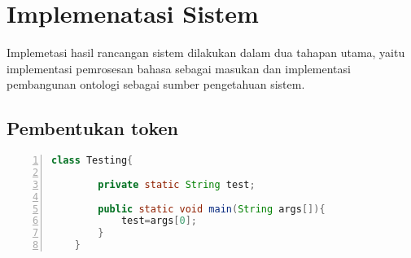 \section{Implemenatasi Sistem}
Implemetasi hasil rancangan sistem dilakukan dalam dua tahapan utama, yaitu implementasi pemrosesan bahasa sebagai masukan dan implementasi pembangunan ontologi sebagai sumber pengetahuan sistem.

\subsection{Pembentukan token}

\begin{lstlisting}[language=JAVA, numbers=left]
	class Testing{

		private static String test;

		public static void main(String args[]){
			test=args[0];
		}
	}
\end{lstlisting}
